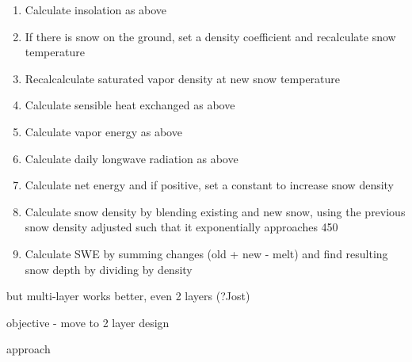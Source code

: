\documentclass[12pt]{article}
\begin{document}
\begin{enumerate}
\begin{enumerate}
    \item Calculate insolation as above
    \item If there is snow on the ground, set a density coefficient and recalculate snow temperature
    \item Recalcalculate saturated vapor density at new snow temperature
    \item Calculate sensible heat exchanged as above
    \item Calculate vapor energy as above
    \item Calculate daily longwave radiation as above
    \item Calculate net energy and if positive, set a constant to increase snow density
    \item Calculate snow density by blending existing and new snow, using the previous snow density adjusted such that it exponentially approaches 450
    \item Calculate SWE by summing changes (old + new - melt) and find resulting snow depth by dividing by density
  \end{enumerate}
\end{enumerate}


but multi-layer works better, even 2 layers (?Jost)

objective - move to 2 layer design

approach
\end{document}
